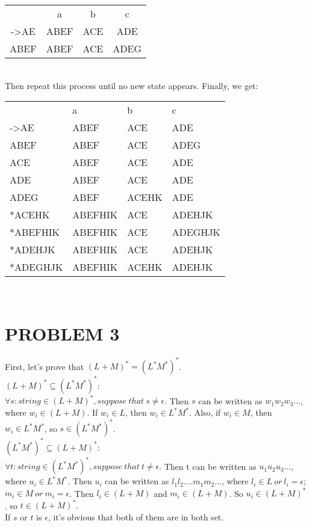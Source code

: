 \documentclass{ctexart}
\begin{document}
\begin{tabular}{cccc}
	     & a    & b   & c    \\
	->AE & ABEF & ACE & ADE  \\
	ABEF & ABEF & ACE & ADEG \\
\end{tabular}\\
Then repeat this process until no new state appears. Finally, we get:\\
\begin{tabular}{llll}
	         & a       & b     & c       \\
	->AE     & ABEF    & ACE   & ADE     \\
	ABEF     & ABEF    & ACE   & ADEG    \\
	ACE      & ABEF    & ACE   & ADE     \\
	ADE      & ABEF    & ACE   & ADE     \\
	ADEG     & ABEF    & ACEHK & ADE     \\
	*ACEHK   & ABEFHIK & ACE   & ADEHJK  \\
	*ABEFHIK & ABEFHIK & ACE   & ADEGHJK \\
	*ADEHJK  & ABEFHIK & ACE   & ADEHJK  \\
	*ADEGHJK & ABEFHIK & ACEHK & ADEHJK  \\
\end{tabular}\\

\section{PROBLEM 3}
First, let's prove that $(L+M)^*=(L^*M^*)^*$.\\

$(L+M)^*\subseteq(L^*M^*)^*$:\\
$\forall s:string \in (L+M)^*, suppose\ that\ s \ne \epsilon.$
Then $s$ can be written as $w_1w_2w_3...$, where $w_i \in (L+M)$.
If $w_i \in L$, then $w_i \in L^*M^*$.
Also, if $w_i \in M$, then $w_i \in L^*M^*$, so $s \in (L^*M^*)^*$.\\
$(L^*M^*)^*\subseteq(L+M)^*$:\\
$\forall t:string \in (L^*M^*)^*, suppose\ that\ t \ne \epsilon.$
Then t can be written as $u_1u_2u_3...$, where $u_i \in L^*M^*$.
Then $u_i$ can be written as $l_1l_2....m_1m_2...$, where $l_i \in L\ or\ l_i=\epsilon$;
$m_i \in M \ or\ m_i=\epsilon$. Then $l_i \in (L+M)$ and $m_i \in (L+M)$. 
So $u_i \in (L+M)^*$, so $t \in (L+M)^*$. \\
If $s$ or $t$ is $\epsilon$, it's obvious that both of them are in both set.
\end{document}
